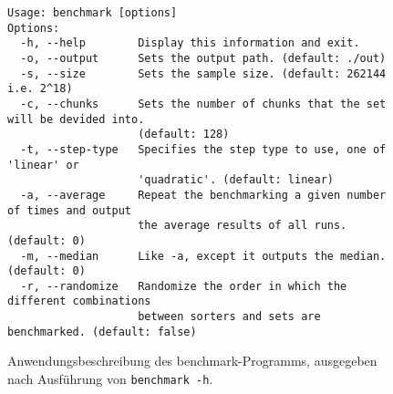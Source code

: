 \begin{figure}[hbp]
    \begin{lstlisting}[language=none, numbers=none]
Usage: benchmark [options]
Options:
  -h, --help        Display this information and exit.
  -o, --output      Sets the output path. (default: ./out)
  -s, --size        Sets the sample size. (default: 262144 i.e. 2^18)
  -c, --chunks      Sets the number of chunks that the set will be devided into.
                    (default: 128)
  -t, --step-type   Specifies the step type to use, one of 'linear' or
                    'quadratic'. (default: linear)
  -a, --average     Repeat the benchmarking a given number of times and output
                    the average results of all runs. (default: 0)
  -m, --median      Like -a, except it outputs the median. (default: 0)
  -r, --randomize   Randomize the order in which the different combinations
                    between sorters and sets are benchmarked. (default: false)
    \end{lstlisting}
    \caption{Anwendungsbeschreibung des benchmark-Programms, ausgegeben nach Ausführung von \lstinline{benchmark -h}.}
    \label{fig:benchmark-usage}
\end{figure}





